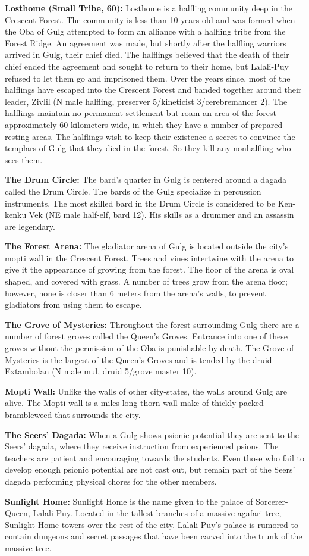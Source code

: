 {
	\textbf{Losthome (Small Tribe, 60):} Losthome is a halfling community deep in the Crescent Forest. The community is less than 10 years old and was formed when the Oba of Gulg attempted to form an alliance with a halfling tribe from the Forest Ridge. An agreement was made, but shortly after the halfling warriors arrived in Gulg, their chief died. The halflings believed that the death of their chief ended the agreement and sought to return to their home, but Lalali-Puy refused to let them go and imprisoned them. Over the years since, most of the halflings have escaped into the Crescent Forest and banded together around their leader, Zivlil (N male halfling, preserver 5/kineticist 3/cerebremancer 2). The halflings maintain no permanent settlement but roam an area of the forest approximately 60 kilometers wide, in which they have a number of prepared resting areas. The halflings wish to keep their existence a secret to convince the templars of Gulg that they died in the forest. So they kill any nonhalfling who sees them.
}
{
	\textbf{The Drum Circle:} The bard's quarter in Gulg is centered around a dagada called the Drum Circle. The bards of the Gulg specialize in percussion instruments. The most skilled bard in the Drum Circle is considered to be Ken-kenku Vek (NE male half-elf, bard 12). His skills as a drummer and an assassin are legendary.

	\textbf{The Forest Arena:} The gladiator arena of Gulg is located outside the city's mopti wall in the Crescent Forest. Trees and vines intertwine with the arena to give it the appearance of growing from the forest. The floor of the arena is oval shaped, and covered with grass. A number of trees grow from the arena floor; however, none is closer than 6 meters from the arena's walls, to prevent gladiators from using them to escape.

	\textbf{The Grove of Mysteries:} Throughout the forest surrounding Gulg there are a number of forest groves called the Queen's Groves. Entrance into one of these groves without the permission of the Oba is punishable by death. The Grove of Mysteries is the largest of the Queen's Groves and is tended by the druid Extambolan (N male mul, druid 5/grove master 10).

	\textbf{Mopti Wall:} Unlike the walls of other city-states, the walls around Gulg are alive. The Mopti wall is a miles long thorn wall make of thickly packed brambleweed that surrounds the city.

	\textbf{The Seers' Dagada:} When a Gulg shows psionic potential they are sent to the Seers' dagada, where they receive instruction from experienced psions. The teachers are patient and encouraging towards the students. Even those who fail to develop enough psionic potential are not cast out, but remain part of the Seers' dagada performing physical chores for the other members.

	\textbf{Sunlight Home:} Sunlight Home is the name given to the palace of Sorcerer-Queen, Lalali-Puy. Located in the tallest branches of a massive agafari tree, Sunlight Home towers over the rest of the city. Lalali-Puy's palace is rumored to contain dungeons and secret passages that have been carved into the trunk of the massive tree.
}
